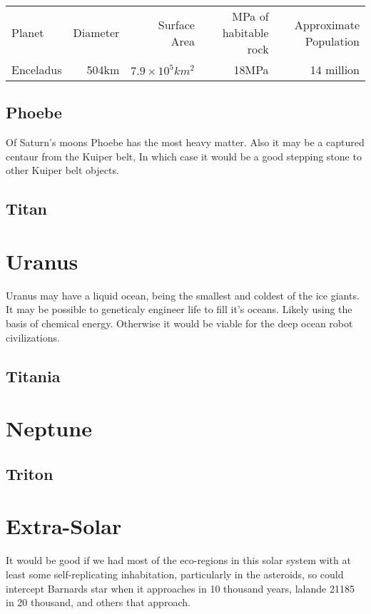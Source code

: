 \begin{tabular}{lrrrr}
  Planet & Diameter & Surface Area & MPa of habitable rock & Approximate Population\\
  Enceladus  & 504km & $7.9\times10^5km^2$ & 18MPa &  14 million\\
\end{tabular}

\subsection{Phoebe}

Of Saturn's moons Phoebe has the most heavy matter.  
Also it may be a captured centaur from the Kuiper belt, 
In which case it would be a good stepping stone to other Kuiper belt objects.

\subsection{Titan}

\section{Uranus}
Uranus may have a liquid ocean, being the smallest and coldest of the ice
giants.  It may be possible to geneticaly engineer life to fill it's oceans. 
Likely using the basis of chemical energy. Otherwise it would be viable for the
deep ocean robot civilizations. 


\subsection{Titania}

\section{Neptune}
\subsection{Triton}


\section{Extra-Solar}

It would be good if we had most of the eco-regions in this solar system with at
least some self-replicating inhabitation, particularly in the asteroids, so
could intercept Barnards star when it approaches in 10 thousand years, lalande
21185 in 20 thousand, and others that approach. 

